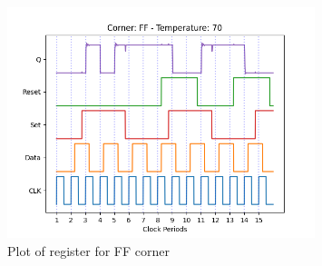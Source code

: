 \begin{figure}[H]
    \centering
    \includegraphics[width=0.8\textwidth]{Figures/Aimspice_Plots/FF_70.png}
    \caption{Plot of register for FF corner}
    \label{fig:FF70}
\end{figure}